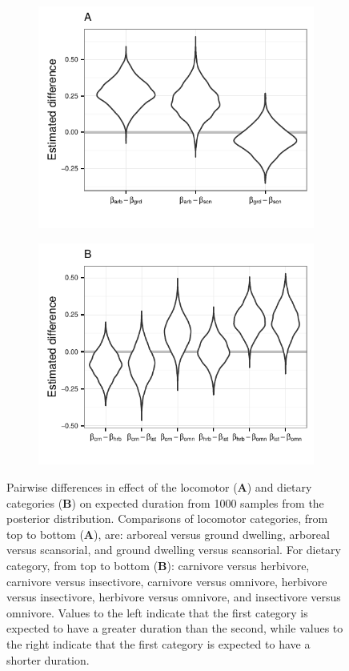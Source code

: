 \documentclass{pnastwo}
\begin{document}
\begin{figure}[ht]
  \centering
  \begin{subfigure}[b]{0.4\textwidth}
    \caption{}
    \includegraphics{figure/loco_diff_est}
    \label{subfig:loco}
  \end{subfigure}
  \begin{subfigure}[b]{0.4\textwidth}
    \caption{}
    \includegraphics{figure/diet_diff_est}
    \label{subfig:diet}
  \end{subfigure}
  \caption{Pairwise differences in effect of the locomotor (\textbf{A}) and dietary categories (\textbf{B}) on expected duration from 1000 samples from the posterior distribution. Comparisons of locomotor categories, from top to bottom (\textbf{A}), are: arboreal versus ground dwelling, arboreal versus scansorial, and ground dwelling versus scansorial. For dietary category, from top to bottom (\textbf{B}): carnivore versus herbivore, carnivore versus insectivore, carnivore versus omnivore, herbivore versus insectivore, herbivore versus omnivore, and insectivore versus omnivore. Values to the left indicate that the first category is expected to have a greater duration than the second, while values to the right indicate that the first category is expected to have a shorter duration.}

\end{figure}
\end{document}
